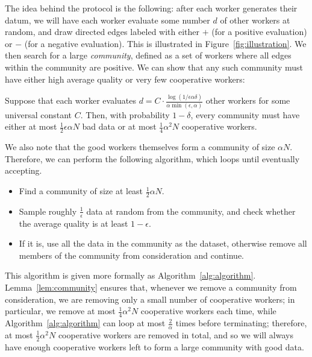 \documentclass[anon,12pt]{colt2016} %
\newcommand{\goodfrac}{\alpha}
\newcommand{\quality}{\epsilon}
\newcommand{\failprob}{\delta}
\begin{document}
The idea behind the protocol is the following: after each worker generates their 
datum, we will have each worker evaluate some number $d$ of other workers at 
random, and draw directed edges labeled with either $+$ (for a positive 
evaluation) or $-$ (for a negative evaluation). This is illustrated in 
Figure~\ref{fig:illustration}. We then search for a large \emph{community}, 
defined as a set of workers where all edges within the community are positive. 
We can show that any such community must have either high average quality 
or very few cooperative workers:
\begin{lemma}
\label{lem:community}
Suppose that each worker evaluates $d = C \cdot \frac{\log(1/\quality\goodfrac\failprob)}{\goodfrac\min(\quality,\goodfrac)}$ 
other workers for some universal constant $C$. 
Then, with probability $1-\delta$, every 
community must have either at most $\frac{1}{2}\quality\goodfrac N$ bad data 
or at most $\frac{1}{4}\goodfrac^2 N$ cooperative workers.
\end{lemma}
We also note that the good workers themselves form a community of size 
$\goodfrac N$. Therefore, we can perform the following algorithm, which loops 
until eventually accepting.
\begin{itemize}
\item Find a community of size at least $\frac{1}{2}\goodfrac N$.
\item Sample roughly $\frac{1}{\quality}$ data at random from the community, 
      and check whether the average quality is at least $1-\quality$.
\item If it is, use all the data in the community as the dataset, 
      otherwise remove all members of the community from consideration 
      and continue.
\end{itemize}
This algorithm is given more formally as Algorithm~\ref{alg:algorithm}. 
Lemma~\ref{lem:community} ensures that, whenever we remove a community 
from consideration, we are removing only a small number of cooperative 
workers; in particular, we remove at most $\frac{1}{4}\goodfrac^2 N$ cooperative 
workers each time, while Algorithm~\ref{alg:algorithm} can loop at most 
$\frac{2}{\goodfrac}$ times before terminating; therefore, at most 
$\frac{1}{2}\goodfrac^2 N$ cooperative workers are removed in total, and 
so we will always have enough cooperative workers left to form a large 
community with good data.
\end{document}
